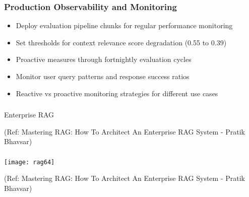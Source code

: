 \begin{frame}[fragile]\frametitle{Production Observability and Monitoring}
      \begin{itemize}
	\item Deploy evaluation pipeline chunks for regular performance monitoring
	\item Set thresholds for context relevance score degradation (0.55 to 0.39)
	\item Proactive measures through fortnightly evaluation cycles
	\item Monitor user query patterns and response success ratios
	\item Reactive vs proactive monitoring strategies for different use cases
	  \end{itemize}
\end{frame}

\begin{frame}[fragile]\frametitle{}
\begin{center}
{\Large Enterprise RAG}

{\tiny (Ref: Mastering RAG: How To Architect An Enterprise RAG System - Pratik Bhavsar)}

\end{center}
\end{frame}

\begin{frame}[fragile]\frametitle{}

	\begin{center}
	\texttt{[image: rag64]}
	
	{\tiny (Ref: Mastering RAG: How To Architect An Enterprise RAG System - Pratik Bhavsar)}
	
	\end{center}
	
	
\end{frame}

